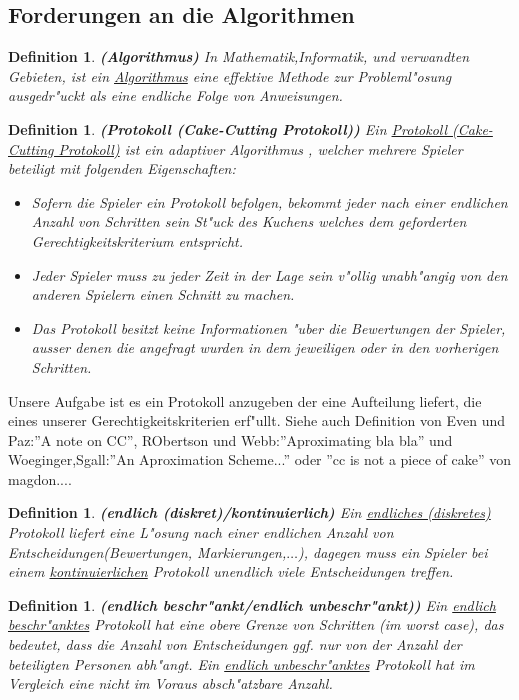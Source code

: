 \documentclass[11pt, a4paper, twoside]{article}
\newtheorem{defi}[satz]{Definition}
\numberwithin{equation}{section}
\begin{document}
\subsection{Forderungen an die Algorithmen}
\begin{defi}{\textbf{(Algorithmus)}}
\newline In Mathematik,Informatik, und verwandten Gebieten, ist ein \underline{Algorithmus} eine effektive Methode zur Probleml"osung ausgedr"uckt als eine endliche Folge von Anweisungen. 
\end{defi}
\begin{defi}{\textbf{(Protokoll (Cake-Cutting Protokoll))}}
\newline Ein \underline{Protokoll (Cake-Cutting Protokoll)} ist ein adaptiver Algorithmus , welcher mehrere Spieler beteiligt mit folgenden Eigenschaften:
\begin{itemize}
\item Sofern die Spieler ein Protokoll befolgen, bekommt jeder nach einer endlichen Anzahl von Schritten sein St"uck des Kuchens welches dem geforderten Gerechtigkeitskriterium entspricht.
\item Jeder Spieler muss zu jeder Zeit in der Lage sein v"ollig unabh"angig von den anderen Spielern einen Schnitt zu machen.
\item Das Protokoll besitzt keine Informationen "uber die Bewertungen der Spieler, ausser denen die angefragt wurden in dem jeweiligen oder in den vorherigen Schritten. 
\end{itemize}
\end{defi}
Unsere Aufgabe ist es ein Protokoll anzugeben der eine Aufteilung liefert, die eines unserer Gerechtigkeitskriterien erf"ullt. Siehe auch Definition von Even und Paz:''A note on CC'', RObertson und Webb:''Aproximating bla bla'' und Woeginger,Sgall:''An Aproximation Scheme...'' oder ''cc is not a piece of cake'' von magdon....
\begin{defi}{\textbf{(endlich (diskret)/kontinuierlich)}}
\newline Ein \underline{endliches (diskretes)} Protokoll liefert eine L"osung nach einer endlichen Anzahl von Entscheidungen(Bewertungen, Markierungen,$\ldots$), dagegen muss ein Spieler bei einem \underline{kontinuierlichen} Protokoll unendlich viele Entscheidungen treffen.
\end{defi}
\begin{defi}{\textbf{(endlich beschr"ankt/endlich unbeschr"ankt))}}
\newline Ein \underline{endlich beschr"anktes} Protokoll hat eine obere Grenze von Schritten (im worst case), das bedeutet, dass die Anzahl von Entscheidungen ggf. nur von der Anzahl der beteiligten Personen abh"angt. Ein \underline{endlich unbeschr"anktes} Protokoll hat im Vergleich eine nicht im Voraus absch"atzbare Anzahl.
\end{defi}
\end{document}
